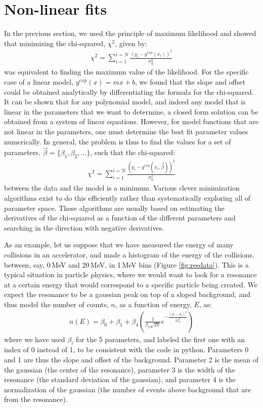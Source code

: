 \section{Non-linear fits}
In the previous section, we used the principle of maximum likelihood and showed that minimizing the chi-squared, $\chi^2$, given by:
\begin{align}
\chi^2=\sum_{i=1}^{i=N}\frac{(y_i-y^{exp}(x_i))^2}{\sigma_{y_i}^2}
\end{align}
was equivalent to finding the maximum value of the likelihood. For the specific case of a linear  model, $y^{exp}(x)=mx+b$, we found that the slope and offset could be obtained analytically by differentiating the formula for the chi-squared. It can be shown that for any polynomial model, and indeed any model that is linear in the parameters that we want to determine, a closed form solution can be obtained from a system of linear equations. However, for model functions that are not linear in the parameters, one must determine the best fit parameter values numerically. In general, the problem is thus to find the values for a set of parameters, $\vec\beta=\{\beta_1, \beta_2,\dots\}$, such that the chi-squared:
\begin{align}
\chi^2=\sum_{i=1}^{i=N}\frac{(y_i-y^{exp}(x_i,\vec\beta))^2}{\sigma_{y_i}^2}
\end{align}
between the data and the model is a minimum. Various clever minimization algorithms exist to do this efficiently rather than systematically exploring all of parameter space. These algorithms are usually based on estimating the derivatives of the chi-squared as a function of the different parameters and searching in the direction with negative derivatives.

As an example, let us suppose that we have measured the energy of many collisions in an accelerator, and made a histogram of the energy of the collisions, between, say, 0\,MeV and 20\,MeV, in 1\,MeV bins (Figure \ref{fig:resdata}). This is a typical situation in particle physics, where we would want to  look for a resonance at a certain energy that would correspond to a specific particle being created. We expect the resonance to be a gaussian peak on top of a sloped background, and thus model the number of counts, $n$, as a function of energy, $E$, as:
\begin{align}
\label{eqn:resdataModel}
n(E)=\beta_0+\beta_1+\beta_4\left( \frac{1}{\beta_3\sqrt{2\pi}}e^{-\frac{(E-\beta_2)^2}{2\beta_3^2}} \right)
\end{align}
where we have used $\beta_i$ for the 5 parameters, and labeled the first one with an index of 0 instead of 1, to be consistent with the code in python. Parameters 0 and 1 are thus the slope and offset of the background. Parameter 2 is the mean of the gaussian (the center of the resonance), parameter 3 is the width of the resonance (the standard deviation of the gaussian), and parameter 4 is the normalization of the gaussian (the number of events above background that are from the resonance). 

